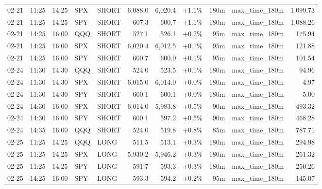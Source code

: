 \documentclass[11pt,a4paper,twoside]{article}
\begin{document}
\begin{center}
\begin{longtable}{>{\color{txtmain}}l l l l l r r r r >{\color{txtmain}}l r}
02-21 & 11:25 & 14:25 & SPX & SHORT & 6,088.0 & 6,020.4 & \textcolor{wingreen}{+1.1\%} & 180m & max\_time\_180m & \textcolor{wingreen}{1,099.73} \\
02-21 & 11:25 & 14:25 & SPY & SHORT & 607.3 & 600.7 & \textcolor{wingreen}{+1.1\%} & 180m & max\_time\_180m & \textcolor{wingreen}{1,088.26} \\
02-21 & 14:25 & 16:00 & QQQ & SHORT & 527.1 & 526.1 & \textcolor{wingreen}{+0.2\%} & 95m & max\_time\_180m & \textcolor{wingreen}{175.94} \\
02-21 & 14:25 & 16:00 & SPX & SHORT & 6,020.4 & 6,012.5 & \textcolor{wingreen}{+0.1\%} & 95m & max\_time\_180m & \textcolor{wingreen}{121.88} \\
02-21 & 14:25 & 16:00 & SPY & SHORT & 600.7 & 600.0 & \textcolor{wingreen}{+0.1\%} & 95m & max\_time\_180m & \textcolor{wingreen}{101.54} \\
02-24 & 11:30 & 14:30 & QQQ & SHORT & 524.0 & 523.5 & \textcolor{wingreen}{+0.1\%} & 180m & max\_time\_180m & \textcolor{wingreen}{94.96} \\
02-24 & 11:30 & 14:30 & SPX & SHORT & 6,015.0 & 6,014.0 & \textcolor{wingreen}{+0.0\%} & 180m & max\_time\_180m & \textcolor{wingreen}{4.97} \\
02-24 & 11:30 & 14:30 & SPY & SHORT & 600.1 & 600.1 & \textcolor{wingreen}{+0.0\%} & 180m & max\_time\_180m & \textcolor{lossred}{-5.00} \\
02-24 & 14:30 & 16:00 & SPX & SHORT & 6,014.0 & 5,983.8 & \textcolor{wingreen}{+0.5\%} & 90m & max\_time\_180m & \textcolor{wingreen}{493.32} \\
02-24 & 14:30 & 16:00 & SPY & SHORT & 600.1 & 597.2 & \textcolor{wingreen}{+0.5\%} & 90m & max\_time\_180m & \textcolor{wingreen}{468.28} \\
02-24 & 14:35 & 16:00 & QQQ & SHORT & 524.0 & 519.8 & \textcolor{wingreen}{+0.8\%} & 85m & max\_time\_180m & \textcolor{wingreen}{787.71} \\
02-25 & 11:25 & 14:25 & QQQ & LONG & 511.5 & 513.1 & \textcolor{wingreen}{+0.3\%} & 180m & max\_time\_180m & \textcolor{wingreen}{294.98} \\
02-25 & 11:25 & 14:25 & SPX & LONG & 5,930.2 & 5,946.2 & \textcolor{wingreen}{+0.3\%} & 180m & max\_time\_180m & \textcolor{wingreen}{261.32} \\
02-25 & 11:25 & 14:25 & SPY & LONG & 591.7 & 593.3 & \textcolor{wingreen}{+0.3\%} & 180m & max\_time\_180m & \textcolor{wingreen}{250.26} \\
02-25 & 14:25 & 16:00 & SPY & LONG & 593.3 & 594.2 & \textcolor{wingreen}{+0.2\%} & 95m & max\_time\_180m & \textcolor{wingreen}{145.07} \\

\end{longtable}
\end{center}
\end{document}
